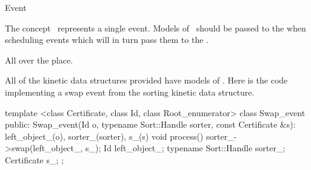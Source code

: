 
\begin{ccRefConcept}{Event}


\ccDefinition
  
The concept \ccClassName\ represents a single event. Models of
\ccClassName\ should be passed to the  when
scheduling events which will in turn pass them to the
.


\ccOperations



\ccHasModels

All over the place. 

\ccSeeAlso


\ccExample

All of the kinetic data structures provided have models of
\ccRefName. Here is the code implementing a swap event from the
sorting kinetic data structure.

\begin{ccExampleCode}
template <class Certificate, class Id, class Root_enumerator> 
class Swap_event {
public:
  Swap_event(Id o, typename Sort::Handle sorter, 
	     const Certificate &s): left_object_(o), 
                                    sorter_(sorter), 
                                    s_(s){}
  void process(){
    sorter_->swap(left_object_, s_);
  }
  Id left_object_; 
  typename Sort::Handle sorter_; 
  Certificate s_;
};
\end{ccExampleCode}


\end{ccRefConcept}


